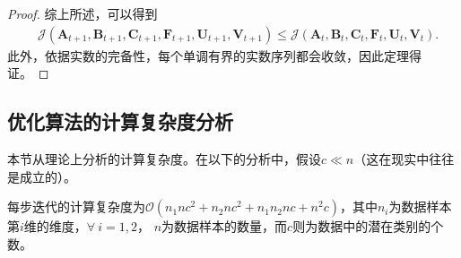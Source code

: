 \begin{proof}
综上所述，可以得到
\begin{equation*}
\begin{aligned}
    &\mathcal{J}(\boldsymbol{A}_{t+1},\boldsymbol{B}_{t+1},\boldsymbol{C}_{t+1},\boldsymbol{F}_{t+1},\boldsymbol{U}_{t+1},\boldsymbol{V}_{t+1})\leq\mathcal{J}(\boldsymbol{A}_{t},\boldsymbol{B}_{t},\boldsymbol{C}_{t},\boldsymbol{F}_{t},\boldsymbol{U}_{t},\boldsymbol{V}_{t}).
\end{aligned}
\end{equation*}
此外，依据实数的完备性，每个单调有界的实数序列都会收敛，因此定理得证。
\end{proof}\vspace{0.5em}

\subsection{优化算法的计算复杂度分析}\label{sec:companal}
本节从理论上分析的计算复杂度。在以下的分析中，假设$c\ll n$（这在现实中往往是成立的）。

\begin{theorem}\label{thm:complexity-cpufs}\kaishu
    每步迭代的计算复杂度为$\mathcal{O}(n_{1}nc^{2}+n_{2}nc^{2}+n_{1}n_{2}nc+n^{2}c)$，其中$n_{i}$为数据样本第$i$维的维度，$\forall~ i=1,2$， $n$为数据样本的数量，而$c$则为数据中的潜在类别的个数。
\end{theorem}

